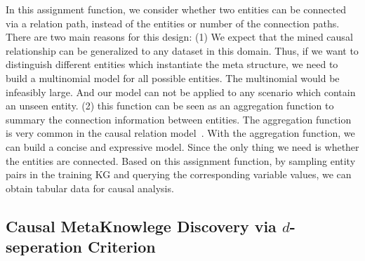 In this assignment function, we consider whether two entities can be connected via a relation path, instead of the entities or number of the connection paths.
There are two main reasons for this design:
(1) We expect that the mined causal relationship can be generalized to any dataset in this domain.
Thus, if we want to distinguish different entities which instantiate the meta structure, we need to build a multinomial model for all possible entities.
The multinomial would be infeasibly large.
And our model can not be applied to any scenario which contain an unseen entity.
(2) this function can be seen as an aggregation function to summary the connection information between entities.
The aggregation function is very common in the causal relation model~\cite{maier2010learning,lee2016learning,lee2020towards,salimi2020causal}.
With the aggregation function, we can build a concise and expressive model.
Since the only thing we need is whether the entities are connected.
Based on this assignment function, by sampling entity pairs in the training KG and querying the corresponding variable values, we can obtain tabular data for causal analysis.




\subsection{Causal MetaKnowlege Discovery via $d$-seperation Criterion}
\label{sec:discovery}

